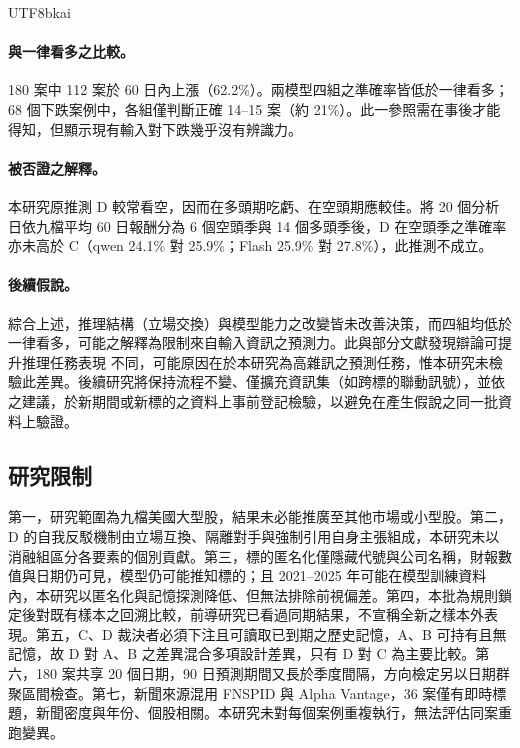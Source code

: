 \documentclass[12pt,a4paper]{article}
\newcommand{\grp}[1]{\textsf{#1}}
\begin{document}
\begin{CJK}{UTF8}{bkai}
\paragraph{與一律看多之比較。} 180 案中 112 案於 60 日內上漲（62.2\%）。兩模型四組之準確率皆低於一律看多；68 個下跌案例中，各組僅判斷正確 14--15 案（約 21\%）。此一參照需在事後才能得知，但顯示現有輸入對下跌幾乎沒有辨識力。

\paragraph{被否證之解釋。} 本研究原推測 \grp{D} 較常看空，因而在多頭期吃虧、在空頭期應較佳。將 20 個分析日依九檔平均 60 日報酬分為 6 個空頭季與 14 個多頭季後，\grp{D} 在空頭季之準確率亦未高於 \grp{C}（qwen 24.1\% 對 25.9\%；Flash 25.9\% 對 27.8\%），此推測不成立。

\paragraph{後續假說。} 綜合上述，推理結構（立場交換）與模型能力之改變皆未改善決策，而四組均低於一律看多，可能之解釋為限制來自輸入資訊之預測力。此與部分文獻發現辯論可提升推理任務表現 \citep{du2023debate,liang2023divergent} 不同，可能原因在於本研究為高雜訊之預測任務，惟本研究未檢驗此差異。後續研究將保持流程不變、僅擴充資訊集（如跨標的聯動訊號），並依 \citet{nosek2018prereg} 之建議，於新期間或新標的之資料上事前登記檢驗，以避免在產生假說之同一批資料上驗證。

\subsection{研究限制}

第一，研究範圍為九檔美國大型股，結果未必能推廣至其他市場或小型股。第二，D 的自我反駁機制由立場互換、隔離對手與強制引用自身主張組成，本研究未以消融組區分各要素的個別貢獻。第三，標的匿名化僅隱藏代號與公司名稱，財報數值與日期仍可見，模型仍可能推知標的；且 2021--2025 年可能在模型訓練資料內，本研究以匿名化與記憶探測降低、但無法排除前視偏差。第四，本批為規則鎖定後對既有樣本之回溯比較，前導研究已看過同期結果，不宣稱全新之樣本外表現。第五，\grp{C}、\grp{D} 裁決者必須下注且可讀取已到期之歷史記憶，\grp{A}、\grp{B} 可持有且無記憶，故 \grp{D} 對 \grp{A}、\grp{B} 之差異混合多項設計差異，只有 \grp{D} 對 \grp{C} 為主要比較。第六，180 案共享 20 個日期，90 日預測期間又長於季度間隔，方向檢定另以日期群聚區間檢查。第七，新聞來源混用 FNSPID 與 Alpha Vantage，36 案僅有即時標題，新聞密度與年份、個股相關。本研究未對每個案例重複執行，無法評估同案重跑變異。


\end{CJK}
\end{document}
